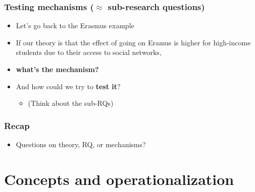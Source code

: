 \documentclass[aspectratio=43]{beamer}
\begin{document}
\begin{frame}
\frametitle{Testing mechanisms ($\approx$ sub-research questions)}
\centering

\begin{itemize}
  \item Let's go back to the Erasmus example
  \item If our theory is that the effect of going on Eramus is higher for high-income students due to their access to social networks,
  \item[] \textbf{what's the mechanism?}
  \item And how could we try to \textbf{test it}?
  \begin{itemize}
    \item (Think about the sub-RQs)
  \end{itemize}
\end{itemize}

\end{frame}

\begin{frame}
\frametitle{Recap}
\centering

\begin{itemize}
  \item Questions on theory, RQ, or mechanisms?
\end{itemize}

\end{frame}

\section{Concepts and operationalization}
\end{document}
